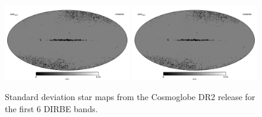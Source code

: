 \documentclass{aa}
\begin{document}
\begin{figure}
  \includegraphics[width=0.49\textwidth]{figs/starmaps/stars_std_05.pdf}
  \includegraphics[width=0.49\textwidth]{figs/starmaps/stars_std_06.pdf} \\
  \caption{Standard deviation star maps from the Cosmoglobe DR2 release for the first 6 DIRBE bands. }
  \label{fig:starsstd}
\end{figure}
\end{document}
